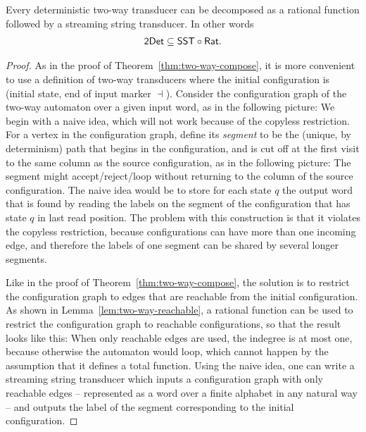 \begin{lemma}\label{lem:two-way-to-sst} Every deterministic two-way transducer can be decomposed as a rational function followed by a streaming string transducer. In other words
  \begin{align*}
\mathsf{2Det} \subseteq \mathsf{SST} \circ \mathsf{Rat}.	
\end{align*}
\end{lemma}
\begin{proof} As in the proof of Theorem~\ref{thm:two-way-compose}, it  is more convenient to use a definition of two-way transducers where the initial configuration is  (initial state, end of input marker $\dashv$). 
Consider the configuration graph of the two-way automaton over a given input word,
as in the following picture:
We begin with a naive idea, which will not work because of the copyless restriction. For a  vertex in the configuration graph, define its \emph{segment} to be the (unique, by determinism) path that begins in the configuration, and is cut off at the first visit to the  same column as the source configuration, as in the following picture:
The segment might accept/reject/loop without returning to the column of the source configuration. The naive idea would be to store for each state $q$ the output word that is found by reading the labels on  the segment of the configuration that has  state $q$ in last read position.  The problem with this construction is that it violates  the copyless restriction, because  configurations can have more than one incoming edge, and therefore the labels of one segment can be shared by several longer segments.

Like in the proof of Theorem~\ref{thm:two-way-compose}, the solution is to restrict the configuration graph to edges that are reachable from the initial configuration. As shown in Lemma~\ref{lem:two-way-reachable}, a rational function can be used to restrict the configuration graph to reachable configurations, so that the result looks like this:
 When only reachable edges are used, the indegree is at most one, because otherwise the automaton would loop, which cannot happen by the assumption that it defines a total function.  
 Using the naive idea, one can write a streaming string transducer which inputs a configuration graph with only reachable edges -- represented as a word over a finite alphabet in any natural way -- and outputs the label of the segment corresponding to the initial configuration. 
\end{proof}
 

